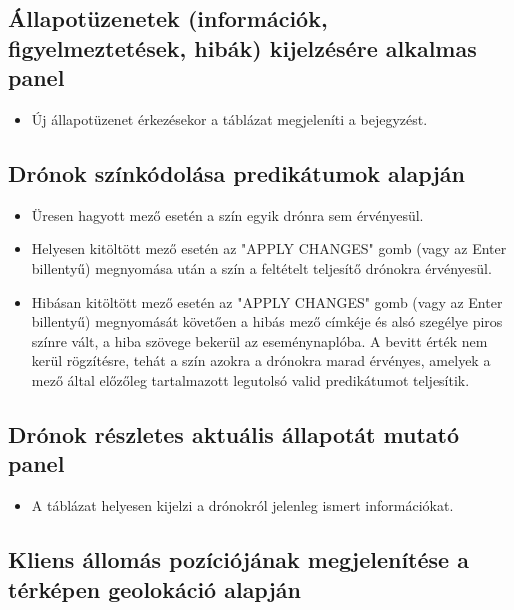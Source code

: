 \subsection{Állapotüzenetek (információk, figyelmeztetések, hibák) kijelzésére alkalmas panel}

\begin{itemize}

  \item Új állapotüzenet érkezésekor a táblázat megjeleníti a bejegyzést.

\end{itemize}


\subsection{Drónok színkódolása predikátumok alapján}

\begin{itemize}

  \item Üresen hagyott mező esetén a szín egyik drónra sem érvényesül.

  \item Helyesen kitöltött mező esetén az "APPLY CHANGES" gomb (vagy az Enter
  billentyű) megnyomása után a szín a feltételt teljesítő drónokra érvényesül.

  \item Hibásan kitöltött mező esetén az "APPLY CHANGES" gomb (vagy az Enter
  billentyű) megnyomását követően a hibás mező címkéje és alsó szegélye piros
  színre vált, a hiba szövege bekerül az eseménynaplóba. A bevitt érték nem
  kerül rögzítésre, tehát a szín azokra a drónokra marad érvényes, amelyek a
  mező által előzőleg tartalmazott legutolsó valid predikátumot teljesítik.

\end{itemize}


\subsection{Drónok részletes aktuális állapotát mutató panel}

\begin{itemize}

  \item A táblázat helyesen kijelzi a drónokról jelenleg ismert információkat.

\end{itemize}


\subsection{Kliens állomás pozíciójának megjelenítése a térképen geolokáció alapján}

